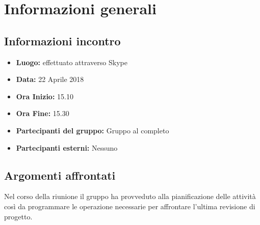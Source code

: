 \documentclass[a4paper, oneside, openany]{article}
\begin{document}
	\section{Informazioni generali}
		\subsection{Informazioni incontro}
			\begin{itemize}
				\item { \textbf{Luogo:} effettuato attraverso Skype }
				\item { \textbf{Data:} 22 Aprile 2018 }
				\item { \textbf{Ora Inizio:} 15.10 }
					\item { \textbf{Ora Fine:} 15.30 }
				\item { \textbf{Partecipanti del gruppo:} Gruppo al completo }
				\item { \textbf{Partecipanti esterni:} Nessuno }
			\end{itemize}
		
	
	\subsection{Argomenti affrontati}
    Nel corso della riunione il gruppo ha provveduto alla pianificazione delle attività così da programmare le operazione necessarie per affrontare l'ultima revisione di progetto.
    
\end{document}
